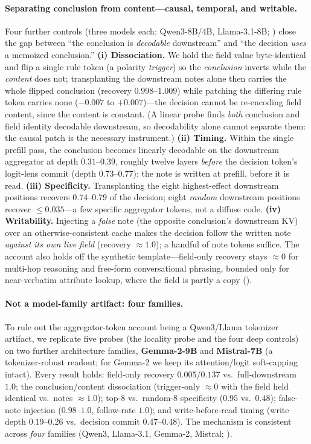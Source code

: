 \paragraph{Separating conclusion from content---causal, temporal, and writable.} Four further
controls (three models each: Qwen3-8B/4B, Llama-3.1-8B; ) close the gap
between ``the conclusion is \emph{decodable} downstream'' and ``the decision \emph{uses} a
memoized conclusion.'' \textbf{(i) Dissociation.} We hold the field value byte-identical and
flip a single rule token (a polarity \emph{trigger}) so the \emph{conclusion} inverts while
the \emph{content} does not; transplanting the downstream notes alone then carries the whole
flipped conclusion (recovery $0.998$--$1.009$) while patching the differing rule token carries
none ($-0.007$ to $+0.007$)---the decision cannot be re-encoding field content, since the
content is constant. (A linear probe finds \emph{both} conclusion and field identity decodable
downstream, so decodability alone cannot separate them: the causal patch is the necessary
instrument.) \textbf{(ii) Timing.} Within the single prefill pass, the conclusion becomes
linearly decodable on the downstream aggregator at depth $0.31$--$0.39$, roughly twelve layers
\emph{before} the decision token's logit-lens commit (depth $0.73$--$0.77$): the note is
written at prefill, before it is read. \textbf{(iii) Specificity.} Transplanting the eight
highest-effect downstream positions recovers $0.74$--$0.79$ of the decision; eight \emph{random}
downstream positions recover ${\le}0.035$---a few specific aggregator tokens, not a diffuse
code. \textbf{(iv) Writability.} Injecting a \emph{false} note (the opposite conclusion's
downstream KV) over an otherwise-consistent cache makes the decision follow the written note
\emph{against its own live field} (recovery $\approx 1.0$); a handful of note tokens suffice.
The account also holds off the synthetic template---field-only recovery stays ${\approx}0$ for
multi-hop reasoning and free-form conversational phrasing, bounded only for near-verbatim
attribute lookup, where the field is partly a copy ().

\paragraph{Not a model-family artifact: four families.} To rule out the aggregator-token account being
a Qwen3/Llama tokenizer artifact, we replicate five probes (the locality probe and the four deep
controls) on two further architecture families,
\textbf{Gemma-2-9B} and \textbf{Mistral-7B} (a tokenizer-robust readout; for Gemma-2 we keep its
attention/logit soft-capping intact). Every result holds: field-only recovery $0.005$/$0.137$ vs.\
full-downstream $1.0$; the conclusion/content dissociation (trigger-only $\approx0$ with the field held
identical vs.\ notes $\approx1.0$); top-$8$ vs.\ random-$8$ specificity ($0.95$ vs.\ $0.48$); false-note
injection ($0.98$--$1.0$, follow-rate $1.0$); and write-before-read timing (write depth $0.19$--$0.26$ vs.\
decision commit $0.47$--$0.48$). The mechanism is consistent across \emph{four} families (Qwen3, Llama-3.1,
Gemma-2, Mistral; \Cref{app:deepmech}).

